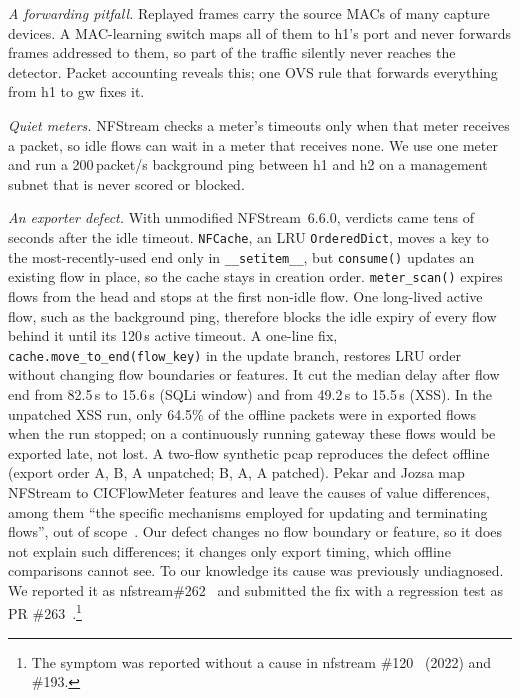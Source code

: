 \emph{A forwarding pitfall.} Replayed frames carry the source MACs of many capture devices. A MAC-learning switch maps all of them to h1's port and never forwards frames addressed to them, so part of the traffic silently never reaches the detector. Packet accounting reveals this; one OVS rule that forwards everything from h1 to gw fixes it.

\emph{Quiet meters.} NFStream checks a meter's timeouts only when that meter receives a packet, so idle flows can wait in a meter that receives none. We use one meter and run a 200\,packet/s background ping between h1 and h2 on a management subnet that is never scored or blocked.

\emph{An exporter defect.} With unmodified NFStream~6.6.0, verdicts came tens of seconds after the idle timeout. \texttt{NFCache}, an LRU \texttt{OrderedDict}, moves a key to the most-recently-used end only in \texttt{\_\_setitem\_\_}, but \texttt{consume()} updates an existing flow in place, so the cache stays in creation order. \texttt{meter\_scan()} expires flows from the head and stops at the first non-idle flow. One long-lived active flow, such as the background ping, therefore blocks the idle expiry of every flow behind it until its 120\,s active timeout. A one-line fix, \texttt{cache.move\_to\_end(flow\_key)} in the update branch, restores LRU order without changing flow boundaries or features. It cut the median delay after flow end from 82.5\,s to 15.6\,s (SQLi window) and from 49.2\,s to 15.5\,s (XSS). In the unpatched XSS run, only 64.5\% of the offline packets were in exported flows when the run stopped; on a continuously running gateway these flows would be exported late, not lost. A two-flow synthetic pcap reproduces the defect offline (export order A, B, A unpatched; B, A, A patched). Pekar and Jozsa map NFStream to CICFlowMeter features and leave the causes of value differences, among them ``the specific mechanisms employed for updating and terminating flows'', out of scope~\cite{pekar2024integrity}. Our defect changes no flow boundary or feature, so it does not explain such differences; it changes only export timing, which offline comparisons cannot see. To our knowledge its cause was previously undiagnosed. We reported it as nfstream\#262~\cite{nfstream262} and submitted the fix with a regression test as PR \#263~\cite{nfstream263}.\footnote{The symptom was reported without a cause in nfstream \#120~\cite{nfstream120} (2022) and \#193.}
